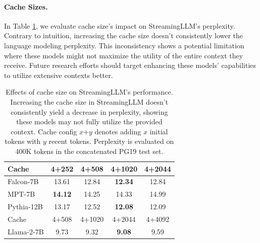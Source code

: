 \documentclass{article} \usepackage{iclr2024_conference,times}
\def\method{StreamingLLM\xspace}
\newcommand{\myparagraph}[1]{\vspace{0pt}\paragraph{#1}}
\begin{document}
\myparagraph{Cache Sizes.} In Table \ref{tab:cache_size}, we evaluate cache size's impact on \method's perplexity. Contrary to intuition, increasing the cache size doesn't consistently lower the language modeling perplexity. This inconsistency shows a potential limitation where these models might not maximize the utility of the entire context they receive. Future research efforts should target enhancing these models' capabilities to utilize extensive contexts better.
\begin{table}
    \centering
    \setlength{\tabcolsep}{2pt}
\small
    \caption{\small Effects of cache size on \method's performance.
    Increasing the cache size in \method doesn't consistently yield a decrease in perplexity, showing these models may not fully utilize the provided context.
    Cache config $x$+$y$ denotes adding $x$ initial tokens with $y$ recent tokens.
    Perplexity is evaluated on 400K tokens in the concatenated PG19 test set.
    }
    \vspace{-0.5em}
    \label{tab:cache_size}
    \begin{tabular}{lcccc}
\toprule
Cache     & 4+252   & 4+508   & 4+1020  & 4+2044  \\
\midrule
Falcon-7B  & 13.61 & 12.84 & \textbf{12.34} & 12.84 \\
MPT-7B     & \textbf{14.12} & 14.25 & 14.33 & 14.99 \\
Pythia-12B     &13.17 & 12.52 & \textbf{12.08} & 12.09 \\
\midrule
\midrule
Cache     & 4+508   & 4+1020  & 4+2044  & 4+4092  \\
\midrule
Llama-2-7B & 9.73  & 9.32  & \textbf{9.08}  & 9.59   \\
\bottomrule
\end{tabular}
\end{table}
 
\end{document}
